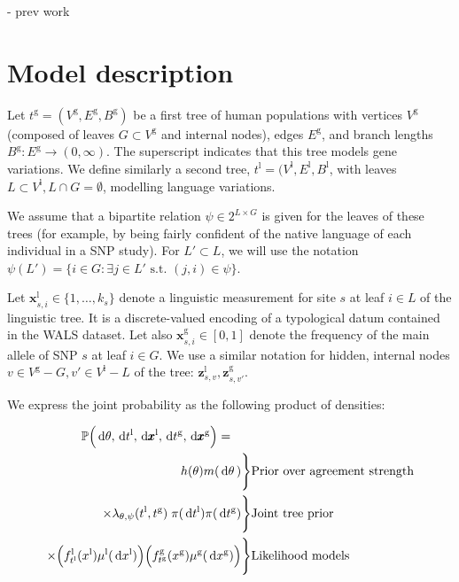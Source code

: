 \documentclass {article}
\newcommand\lgmap{\psi}
\newcommand\data{\pmb{x}}
\newcommand\hidden{\pmb{z}}
\newcommand\gene{{\mathrm{g}}}
\newcommand\lang{{\mathrm{l}}}
\newcommand\lgvar{{\alpha}}
\newcommand{\ud}{\,\mathrm{d}}
\begin{document}
- prev work

\section {Model description}


Let $t^\gene = (V^\gene, E^\gene, B^\gene)$ be a first tree of human populations with vertices $V^\gene$ (composed of leaves $G\subset V^\gene$ and  internal nodes), edges $E^\gene$, and branch lengths $B^\gene : E^\gene \to (0,\infty)$.  The superscript indicates that this tree models gene variations.  We define similarly a second tree, $t^\lang = (V^\lang, E^\lang, B^\lang$, with leaves $L\subset V^\lang, L\cap G = \emptyset$, modelling language variations.

We assume that a bipartite relation $\lgmap \in 2^{ L \times G }$ is given for the leaves of these trees (for example, by being fairly confident of the native language of each individual in a SNP study).  For $L'\subset L$, we will use the notation $\lgmap(L') = \{i \in G : \exists j\in L' \textrm{ s.t. } (j,i)\in\lgmap\}$.

Let $\data_{s,i}^\lang \in \{1,\dots, k_s\}$ denote a linguistic measurement for site $s$ at leaf $i\in L$ of the linguistic tree.  It is a discrete-valued encoding of a typological datum contained in the WALS dataset.  Let also $\data_{s,i}^\gene \in [0,1]$ denote the frequency of the main allele of SNP $s$ at leaf $i\in G$.  We use a similar notation for hidden, internal nodes $v \in V^\gene - G, v' \in V^\lang - L$ of the tree: $\hidden_{s,v}^\lang, \hidden_{s,v'}^\gene$.

We express the joint probability as the following product of densities:


{\footnotesize
\begin{align*}
\P\Big(\ud \theta, \ud t^\lang, \ud \data^\lang, \ud t^\gene, \ud \data^\gene\Big) = \;\;\;\;\;\; & \\
 h(\theta) m(\ud \theta\,) \Bigg\}& \textrm{Prior over agreement strength} \\
 \times \lambda_{\theta,\lgmap}(t^\lang,t^\gene) \; \pi(\ud t^\lang)  \pi(\ud t^\gene) \Bigg\}& \textrm{Joint tree prior} \\
\times \Big(f_{t^\lang}^\lang(x^\lang)  \mu^\lang(\ud x^\lang)\Big)
\Big(f_{t^\gene}^\gene(x^\gene)  \mu^\gene(\ud x^\gene)\Big) \Bigg\}& \textrm{Likelihood models}
\end{align*}
}
\end{document}
